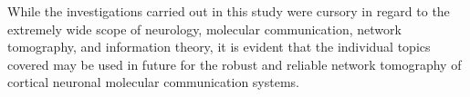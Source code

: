 \documentclass[letterpaper, 10 pt, conference]{ieeeconf}  %
\begin{document}
While the investigations carried out in this study were cursory in regard to the extremely wide scope of neurology, molecular communication, network tomography, and information theory, it is evident that the individual topics covered may be used in future for the robust and reliable network tomography of cortical neuronal molecular communication systems.

\addtolength{\textheight}{-12cm}   %



\end{document}
